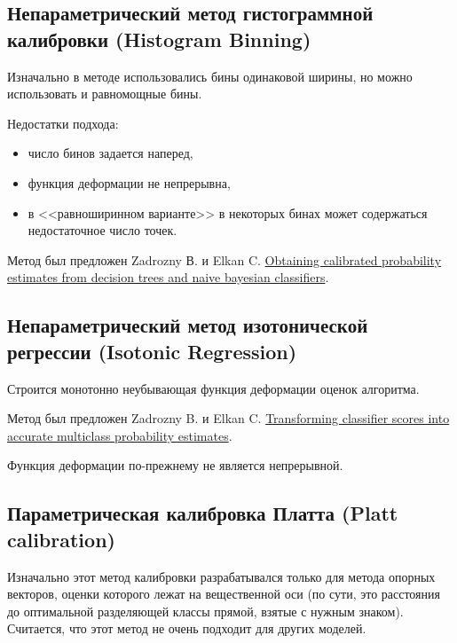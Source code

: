 \documentclass[%
	11pt,
	a4paper,
	utf8,
		]{article}
\begin{document}
\subsection{Непараметрический метод гистограммной калибровки (Histogram Binning)}

Изначально в методе использовались бины одинаковой ширины, но можно использовать и равномощные бины.

Недостатки подхода:

\begin{itemize}
	\item число бинов задается наперед,
	
	\item функция деформации не непрерывна,
	
	\item в <<равноширинном варианте>> в некоторых бинах может содержаться недостаточное число точек.
\end{itemize}

Метод был предложен Zadrozny В. и Elkan C. \href{http://cseweb.ucsd.edu/~elkan/calibrated.pdf}{\ttfamily Obtaining  calibrated  probability  estimates  from  decision  trees  and naive bayesian classifiers}.

\subsection{Непараметрический метод изотонической регрессии (Isotonic Regression)}

Строится монотонно неубывающая функция деформации оценок алгоритма.

Метод был предложен Zadrozny B. и Elkan C. \href{http://citeseerx.ist.psu.edu/viewdoc/download?doi=10.1.1.13.7457&rep=rep1&type=pdf}{\ttfamily Transforming classifier scores into accurate multiclass probability estimates}.

Функция деформации по-прежнему не является непрерывной.

\subsection{Параметрическая калибровка Платта (Platt calibration)}

Изначально этот метод калибровки разрабатывался только для метода опорных векторов, оценки которого лежат на вещественной оси (по сути, это расстояния до оптимальной разделяющей классы прямой, взятые с нужным знаком). Считается, что этот метод не очень подходит для других моделей.
\end{document}
